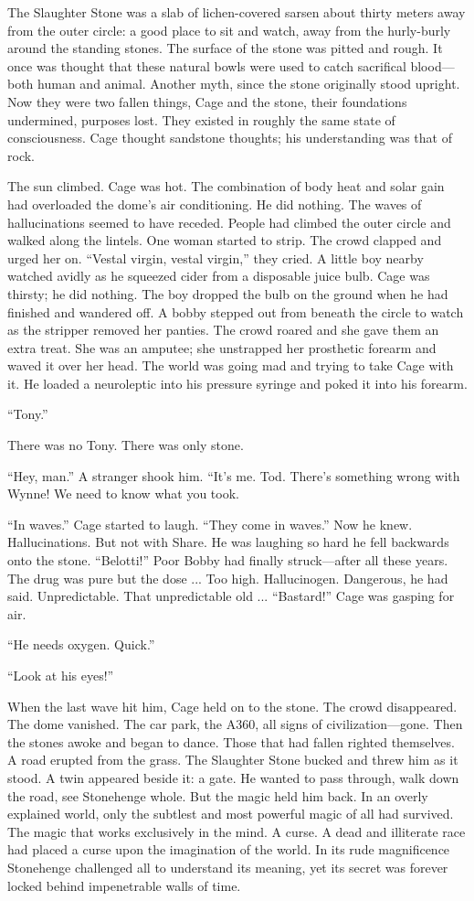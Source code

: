 The Slaughter Stone was a slab of lichen-covered sarsen about thirty meters away from the outer circle: a good place to sit and watch, away from the hurly-burly around the standing stones. The surface of the stone was pitted and rough. It once was thought that these natural bowls were used to catch sacrifical blood---both human and animal. Another myth, since the stone originally stood upright. Now they were two fallen things, Cage and the stone, their foundations undermined, purposes lost. They existed in roughly the same state of consciousness. Cage thought sandstone thoughts; his understanding was that of rock.

The sun climbed. Cage was hot. The combination of body heat and solar gain had overloaded the dome's air conditioning. He did nothing. The waves of hallucinations seemed to have receded. People had climbed the outer circle and walked along the lintels. One woman started to strip. The crowd clapped and urged her on. ``Vestal virgin, vestal virgin,'' they cried. A little boy nearby watched avidly as he squeezed cider from a disposable juice bulb. Cage was thirsty; he did nothing. The boy dropped the bulb on the ground when he had finished and wandered off. A bobby stepped out from beneath the circle to watch as the stripper removed her panties. The crowd roared and she gave them an extra treat. She was an amputee; she unstrapped her prosthetic forearm and waved it over her head. The world was going mad and trying to take Cage with it. He loaded a neuroleptic into his pressure syringe and poked it into his forearm.

``Tony.''

There was no Tony. There was only stone.

``Hey, man.'' A stranger shook him. ``It's me. Tod. There's something wrong with Wynne! We need to know what you took.

``In waves.'' Cage started to laugh. ``They come in waves.'' Now he knew. Hallucinations. But not with Share. He was laughing so hard he fell backwards onto the stone. ``Belotti!'' Poor Bobby had finally struck---after all these years. The drug was pure but the dose ... Too high. Hallucinogen. Dangerous, he had said. Unpredictable. That unpredictable old ... ``Bastard!'' Cage was gasping for air.

``He needs oxygen. Quick.''

``Look at his eyes!''

When the last wave hit him, Cage held on to the stone. The crowd disappeared. The dome vanished. The car park, the A360, all signs of civilization---gone. Then the stones awoke and began to dance. Those that had fallen righted themselves. A road erupted from the grass. The Slaughter Stone bucked and threw him as it stood. A twin appeared beside it: a gate. He wanted to pass through, walk down the road, see Stonehenge whole. But the magic held him back. In an overly explained world, only the subtlest and most powerful magic of all had survived. The magic that works exclusively in the mind. A curse. A dead and illiterate race had placed a curse upon the imagination of the world. In its rude magnificence Stonehenge challenged all to understand its meaning, yet its secret was forever locked behind impenetrable walls of time.

